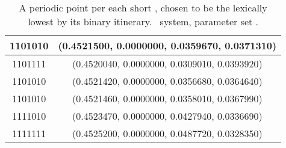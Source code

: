 \begin{table}
\begin{tabular}{c|c}
 	\hline
	1101010  & (0.4521500, 0.0000000, 0.0359670, 0.0371310) \\
 	\hline
	1101111  & (0.4520040, 0.0000000, 0.0309010, 0.0393920) \\
 	\hline
	1101010  & (0.4521420, 0.0000000, 0.0356680, 0.0364640) \\
 	\hline
	1101010  & (0.4521460, 0.0000000, 0.0358010, 0.0367990) \\
 	\hline
	1111010  & (0.4523470, 0.0000000, 0.0427940, 0.0336690) \\
 	\hline
	1111111  & (0.4525200, 0.0000000, 0.0487720, 0.0328350) \\
 	\end{tabular}
	\caption{A periodic point per each
            short \rpo, chosen to be the lexically lowest by its binary itinerary.
             \twoMode\ system, parameter set .}
	\label{tab:symbdyn}
\end{table}
